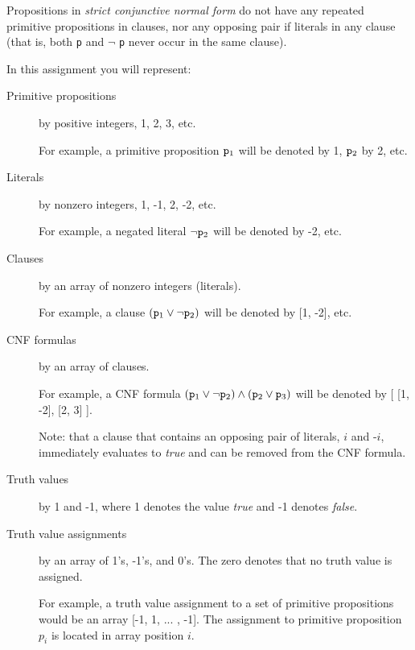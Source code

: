 \documentclass[12pt]{article}
\begin{document}
\smallskip

\noindent
Propositions in {\em strict conjunctive normal form\/} 
do not have any repeated primitive propositions in clauses,
nor any opposing pair if literals in any clause
(that is, both {\tt p} and $\neg$ {\tt p} never occur in the same clause).

\noindent
In this assignment you will represent:

\begin{description}

\item[Primitive propositions]
by positive integers, 1, 2, 3, etc.

For example, a primitive proposition ${\tt p}_1$ will be denoted by 1, 
${\tt p}_2$ by 2, etc.

\item[Literals]
by nonzero integers, 1, -1, 2, -2, etc.

For example, a negated literal $\neg {\tt p}_2$ will be denoted by -2, etc.

\item[Clauses]
by an array of nonzero integers (literals).

For example, a clause $({\tt p}_1\vee\neg{\tt p}_2)$ will be denoted by [1, -2], etc.


\item[CNF formulas]
by an array of clauses.

For example, a CNF formula $({\tt p}_1\vee\neg{\tt p}_2)\wedge({\tt p}_2\vee{\tt p}_3)$
will be denoted by [ [1, -2], [2, 3] ].


Note: that a clause that contains an opposing pair of literals,
$i$ and -$i$, immediately evaluates to {\em true\/} and can be removed from
the CNF formula.

\item[Truth values] by 1 and -1, where 1 denotes the value {\em true\/} 
and -1 denotes {\em false}. 

\item[Truth value assignments] by an array of 1's, -1's, and 0's.
The zero denotes that no truth value is assigned.

For example, a truth value assignment to a set of primitive propositions
would be an array [-1, 1, ... , -1].  The assignment to primitive proposition
$p_i$ is located in array position $i$.



\end{description}
\end{document}
